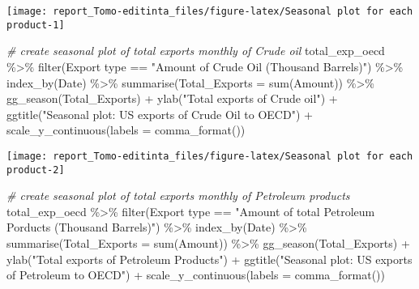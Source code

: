 \documentclass[
]{article}
\newenvironment{Shaded}{\begin{snugshade}}{\end{snugshade}}
\newcommand{\AttributeTok}[1]{\textcolor[rgb]{0.77,0.63,0.00}{#1}}
\newcommand{\CommentTok}[1]{\textcolor[rgb]{0.56,0.35,0.01}{\textit{#1}}}
\newcommand{\FunctionTok}[1]{\textcolor[rgb]{0.00,0.00,0.00}{#1}}
\newcommand{\NormalTok}[1]{#1}
\newcommand{\SpecialCharTok}[1]{\textcolor[rgb]{0.00,0.00,0.00}{#1}}
\newcommand{\StringTok}[1]{\textcolor[rgb]{0.31,0.60,0.02}{#1}}
\begin{document}
\begin{center}\texttt{[image: report\_Tomo-editinta\_files/figure-latex/Seasonal plot for each product-1]} \end{center}

\begin{Shaded}
\begin{Highlighting}[]
\CommentTok{\# create seasonal plot of total exports monthly of Crude oil}
\NormalTok{total\_exp\_oecd }\SpecialCharTok{\%\textgreater{}\%} \FunctionTok{filter}\NormalTok{(}\StringTok{\textasciigrave{}}\AttributeTok{Export type}\StringTok{\textasciigrave{}} \SpecialCharTok{==} \StringTok{"Amount of Crude Oil (Thousand Barrels)"}\NormalTok{) }\SpecialCharTok{\%\textgreater{}\%} 
  \FunctionTok{index\_by}\NormalTok{(Date) }\SpecialCharTok{\%\textgreater{}\%} 
  \FunctionTok{summarise}\NormalTok{(}\AttributeTok{Total\_Exports =} \FunctionTok{sum}\NormalTok{(}\StringTok{\textasciigrave{}}\AttributeTok{Amount}\StringTok{\textasciigrave{}}\NormalTok{)) }\SpecialCharTok{\%\textgreater{}\%} 
  \FunctionTok{gg\_season}\NormalTok{(Total\_Exports) }\SpecialCharTok{+}
  \FunctionTok{ylab}\NormalTok{(}\StringTok{"Total exports  of Crude oil"}\NormalTok{) }\SpecialCharTok{+}
  \FunctionTok{ggtitle}\NormalTok{(}\StringTok{"Seasonal plot: US exports of Crude Oil to OECD"}\NormalTok{) }\SpecialCharTok{+}
  \FunctionTok{scale\_y\_continuous}\NormalTok{(}\AttributeTok{labels =} \FunctionTok{comma\_format}\NormalTok{())}
\end{Highlighting}
\end{Shaded}

\begin{center}\texttt{[image: report\_Tomo-editinta\_files/figure-latex/Seasonal plot for each product-2]} \end{center}

\begin{Shaded}
\begin{Highlighting}[]
\CommentTok{\# create seasonal plot of total exports monthly of Petroleum products}
\NormalTok{total\_exp\_oecd }\SpecialCharTok{\%\textgreater{}\%} \FunctionTok{filter}\NormalTok{(}\StringTok{\textasciigrave{}}\AttributeTok{Export type}\StringTok{\textasciigrave{}} \SpecialCharTok{==} \StringTok{"Amount of total Petroleum Porducts (Thousand Barrels)"}\NormalTok{) }\SpecialCharTok{\%\textgreater{}\%} 
  \FunctionTok{index\_by}\NormalTok{(Date) }\SpecialCharTok{\%\textgreater{}\%} 
  \FunctionTok{summarise}\NormalTok{(}\AttributeTok{Total\_Exports =} \FunctionTok{sum}\NormalTok{(}\StringTok{\textasciigrave{}}\AttributeTok{Amount}\StringTok{\textasciigrave{}}\NormalTok{)) }\SpecialCharTok{\%\textgreater{}\%} 
  \FunctionTok{gg\_season}\NormalTok{(Total\_Exports) }\SpecialCharTok{+}
  \FunctionTok{ylab}\NormalTok{(}\StringTok{"Total exports  of Petroleum Products"}\NormalTok{) }\SpecialCharTok{+}
  \FunctionTok{ggtitle}\NormalTok{(}\StringTok{"Seasonal plot: US exports of Petroleum to OECD"}\NormalTok{) }\SpecialCharTok{+}
  \FunctionTok{scale\_y\_continuous}\NormalTok{(}\AttributeTok{labels =} \FunctionTok{comma\_format}\NormalTok{())}
\end{Highlighting}
\end{Shaded}
\end{document}
